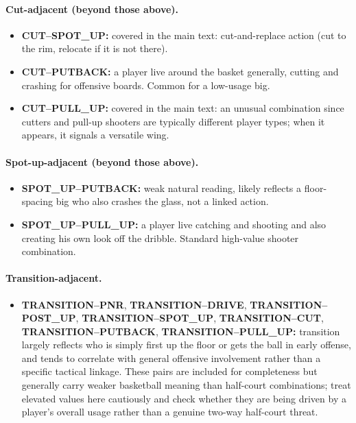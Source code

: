 \documentclass[11pt]{article}
\begin{document}
\paragraph*{Cut-adjacent (beyond those above).}
\begin{itemize}[leftmargin=1.4em,itemsep=0.2em]
 \item \textbf{CUT--SPOT\_UP:} covered in the main text: cut-and-replace action (cut to the
 rim, relocate if it is not there).
 \item \textbf{CUT--PUTBACK:} a player live around the basket generally, cutting and crashing
 for offensive boards. Common for a low-usage big.
 \item \textbf{CUT--PULL\_UP:} covered in the main text: an unusual combination since cutters
 and pull-up shooters are typically different player types; when it appears, it signals a
 versatile wing.
\end{itemize}

\paragraph*{Spot-up-adjacent (beyond those above).}
\begin{itemize}[leftmargin=1.4em,itemsep=0.2em]
 \item \textbf{SPOT\_UP--PUTBACK:} weak natural reading, likely reflects a floor-spacing big
 who also crashes the glass, not a linked action.
 \item \textbf{SPOT\_UP--PULL\_UP:} a player live catching and shooting and also creating his
 own look off the dribble. Standard high-value shooter combination.
\end{itemize}

\paragraph*{Transition-adjacent.}
\begin{itemize}[leftmargin=1.4em,itemsep=0.2em]
 \item \textbf{TRANSITION--PNR}, \textbf{TRANSITION--DRIVE}, \textbf{TRANSITION--POST\_UP},
 \textbf{TRANSITION--SPOT\_UP}, \textbf{TRANSITION--CUT}, \textbf{TRANSITION--PUTBACK},
 \textbf{TRANSITION--PULL\_UP:} transition largely reflects who is simply first up the floor
 or gets the ball in early offense, and tends to correlate with general offensive involvement
 rather than a specific tactical linkage. These pairs are included for completeness but
 generally carry weaker basketball meaning than half-court combinations; treat elevated
 values here cautiously and check whether they are being driven by a player's overall usage
 rather than a genuine two-way half-court threat.
\end{itemize}
\end{document}
